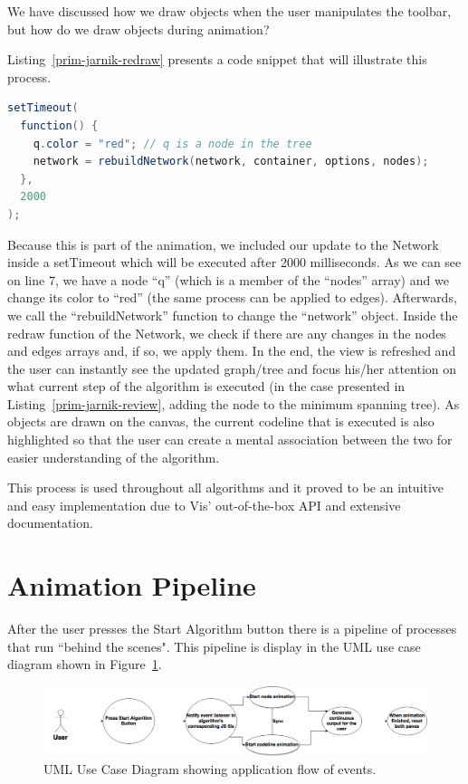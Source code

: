 \documentclass{l4proj}
\begin{document}
We have discussed how we draw objects when the user manipulates the toolbar, but how do we draw objects during animation? 

 Listing~\ref{prim-jarnik-redraw} presents a code snippet that will illustrate this process.

\begin{lstlisting}[language={Java}, label={prim-jarnik-redraw},caption={Network redraw in Prim-Jarnik Minimum Spanning Tree.}]
setTimeout(
  function() {
    q.color = "red"; // q is a node in the tree
    network = rebuildNetwork(network, container, options, nodes);
  },
  2000
);
\end{lstlisting}

Because this is part of the animation, we included our update to the Network inside a setTimeout which will be executed
after 2000 milliseconds. As we can see on line 7, we have a node ``q'' (which is a member of the ``nodes'' array) and we change its color to
``red'' (the same process can be applied to edges). Afterwards, we call the ``rebuildNetwork'' function to change the ``network'' object. Inside the redraw function of the Network, we check if
there are any changes in the nodes and edges arrays and, if so, we apply them. In the end, the view is refreshed and
the user can instantly see the updated graph/tree and focus his/her attention on what current step of the algorithm is
executed (in the case presented in Listing~\ref{prim-jarnik-review}, adding the node to the minimum spanning tree). As
objects are drawn on the canvas, the current codeline that is executed is also highlighted so that the user can create a mental association between the two for easier understanding of the algorithm.

This process is used throughout all algorithms and it proved to be an intuitive and easy implementation due to Vis'
out-of-the-box API and extensive documentation.

\section{Animation Pipeline}

After the user presses the Start Algorithm button there is a pipeline of processes that run ``behind the
scenes". This pipeline is display in the UML use case diagram shown in
Figure~\ref{fig:animation_uml_use_case_diagram}.

\begin{figure}[!ht]
    \centering
    \includegraphics[scale=0.3]{animation_uml_use_case_diagram}
    \caption{UML Use Case Diagram showing application flow of events.}
    \label{fig:animation_uml_use_case_diagram}
\end{figure}
\end{document}
